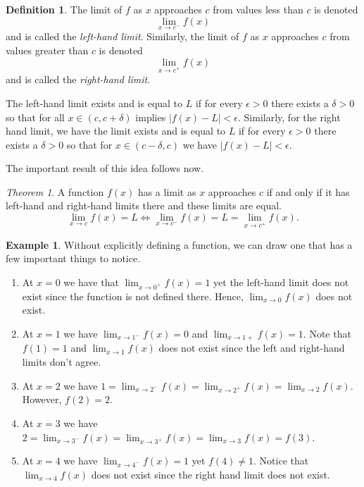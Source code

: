 \documentclass[leqno]{article}
\theoremstyle{definition}
\newtheorem{definition}{Definition}[section]
\newtheorem{example}{Example}[section]
\theoremstyle{remark}
\theoremstyle{theorem}
\newtheorem{theorem}{Theorem}[section]
\begin{document}
\begin{definition}
The limit of $f$ as $x$ approaches $c$ from values less than $c$ is denoted
\[
\lim_{x\to c^-} f(x)
\]
and is called the \emph{left-hand limit}. Similarly, the limit of $f$ as $x$ approaches $c$ from values greater than $c$ is denoted
\[
\lim_{x\to c^+} f(x)
\]
and is called the \emph{right-hand limit}.

The left-hand limit exists and is equal to $L$ if for every $\epsilon>0$ there exists a $\delta>0$ so that for all $x\in (c,c+\delta)$ implies $|f(x)-L|<\epsilon$. Similarly, for the right hand limit, we have the limit exists and is equal to $L$ if for every $\epsilon>0$ there exists a $\delta>0$ so that for $x\in (c-\delta,c)$ we have $|f(x)-L|<\epsilon$.
\end{definition}

The important result of this idea follows now.

\begin{theorem}
A function $f(x)$ has a limit as $x$ approaches $c$ if and only if it has left-hand and right-hand limits there and these limits are equal. 
\[
\lim_{x\to c} f(x) = L \iff \lim_{x\to c^-} f(x)=L=\lim_{x\to c^+} f(x).
\]
\end{theorem}

\begin{example}
Without explicitly defining a function, we can draw one that has a few important things to notice.
\vspace*{5cm}
\begin{enumerate}[1.]
\item At $x=0$ we have that $\lim_{x\to 0^+}f(x)=1$ yet the left-hand limit does not exist since the function is not defined there. Hence, $\lim_{x\to 0}f(x)$ does not exist.
\item At $x=1$ we have $\lim_{x\to 1^-}f(x)=0$ and $\lim_{x\to 1+}f(x)=1$.  Note that $f(1)=1$ and $\lim_{x\to 1}f(x)$ does not exist since the left and right-hand limits don't agree.
\item At $x=2$ we have $1=\lim_{x\to 2^-}f(x)=\lim_{x\to 2^+} f(x)=\lim_{x\to 2}f(x)$. However, $f(2)=2$.  
\item At $x=3$ we have $2=\lim_{x\to 3^-}f(x)=\lim_{x\to 3^+}f(x)=\lim_{x\to 3}f(x)=f(3)$.
\item At $x=4$ we have $\lim_{x\to 4^-}f(x)=1$ yet $f(4)\neq 1$. Notice that $\lim_{x\to 4} f(x)$ does not exist since the right hand limit does not exist.
\end{enumerate}
\end{example}
\end{document}
